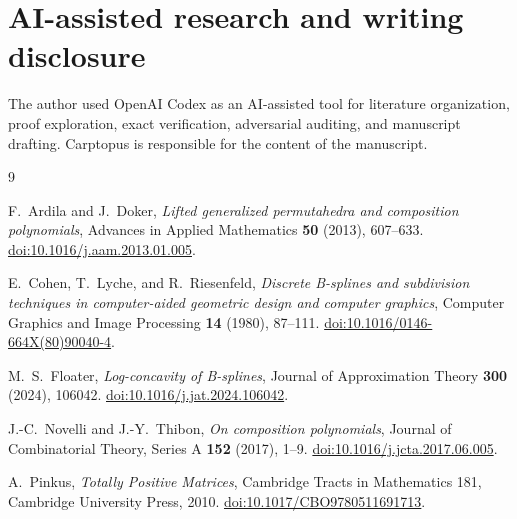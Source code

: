\documentclass[11pt]{article}
\begin{document}
\section*{AI-assisted research and writing disclosure}


The author used OpenAI Codex as an AI-assisted tool for literature organization, proof exploration,
exact verification, adversarial auditing, and manuscript drafting. Carptopus is responsible for the
content of the manuscript.

\begin{thebibliography}{9}
\footnotesize
\raggedright

F.~Ardila and J.~Doker,
\emph{Lifted generalized permutahedra and composition polynomials},
Advances in Applied Mathematics \textbf{50} (2013), 607--633.
\href{https://doi.org/10.1016/j.aam.2013.01.005}{doi:10.1016/j.aam.2013.01.005}.

E.~Cohen, T.~Lyche, and R.~Riesenfeld,
\emph{Discrete B-splines and subdivision techniques in computer-aided geometric design and computer graphics},
Computer Graphics and Image Processing \textbf{14} (1980), 87--111.
\href{https://doi.org/10.1016/0146-664X(80)90040-4}{doi:10.1016/0146-664X(80)90040-4}.

M.~S.~Floater,
\emph{Log-concavity of B-splines},
Journal of Approximation Theory \textbf{300} (2024), 106042.
\href{https://doi.org/10.1016/j.jat.2024.106042}{doi:10.1016/j.jat.2024.106042}.

J.-C.~Novelli and J.-Y.~Thibon,
\emph{On composition polynomials},
Journal of Combinatorial Theory, Series A \textbf{152} (2017), 1--9.
\href{https://doi.org/10.1016/j.jcta.2017.06.005}{doi:10.1016/j.jcta.2017.06.005}.

A.~Pinkus,
\emph{Totally Positive Matrices},
Cambridge Tracts in Mathematics 181, Cambridge University Press, 2010.
\href{https://doi.org/10.1017/CBO9780511691713}{doi:10.1017/CBO9780511691713}.

\end{thebibliography}
\end{document}
